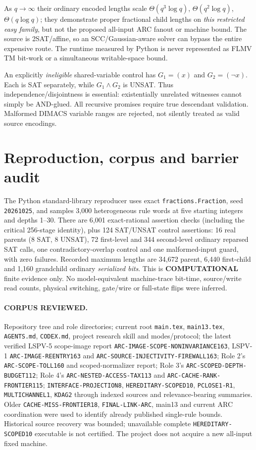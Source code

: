 \documentclass[11pt]{article}
\begin{document}
As $q\to\infty$ their ordinary encoded lengths scale
$\Theta(q^3\log q)$, $\Theta(q^2\log q)$,
$\Theta(q\log q)$; they demonstrate proper fractional
child lengths on \emph{this restricted easy family},
but not the proposed all-input ARC fanout or machine bound.
The source is 2SAT/affine, so an SCC/Gaussian-aware solver
can bypass the entire expensive route. The runtime measured
by Python is never represented as FLMV TM bit-work or a
simultaneous writable-space bound.

An explicitly \emph{ineligible} shared-variable control has
$G_1=(x)$ and $G_2=(\neg x)$.
Each is SAT separately, while $G_1\wedge G_2$ is UNSAT.
Thus independence/disjointness is essential: existentially
unrelated witnesses cannot simply be AND-glued.
All recursive promises require true descendant validation.
Malformed DIMACS variable ranges are rejected, not silently
treated as valid source encodings.

\section{Reproduction, corpus and barrier audit}
The Python standard-library reproducer uses exact
\texttt{fractions.Fraction}, seed \texttt{20261025},
and samples 3,000 heterogeneous rule words at five starting
integers and depths 1--30. There are 6,001
exact-rational assertion checks (including the critical
256-stage identity), plus 124 SAT/UNSAT control assertions:
16 real parents (8 SAT, 8 UNSAT),
72 first-level and 344 second-level ordinary
reparsed SAT calls, one contradictory-overlap
control and one malformed-input guard, with zero failures.
Recorded maximum lengths are 34,672 parent,
6,440 first-child and 1,160 grandchild
ordinary \emph{serialized bits}. This is \textbf{COMPUTATIONAL}
finite evidence only. No model-equivalent machine-trace
bit-time, source/write read counts, physical switching,
gate/wire or full-state flips were inferred.

\paragraph{CORPUS REVIEWED.}
Repository tree and role directories; current root
\texttt{main.tex}, \texttt{main13.tex}, \texttt{AGENTS.md},
\texttt{CODEX.md}, project research skill and modes/protocol;
the latest verified LSPV-5 scope-image report
\texttt{ARC-IMAGE-SCOPE-NONINVARIANCE163},
LSPV-1 \texttt{ARC-IMAGE-REENTRY163} and
\texttt{ARC-SOURCE-INJECTIVITY-FIREWALL163};
Role 2's \texttt{ARC-SCOPE-TOLL160} and scoped-normalizer report;
Role 3's \texttt{ARC-SCOPED-DEPTH-BUDGET112};
Role 4's \texttt{ARC-NESTED-ACCESS-TAX113} and
\texttt{ARC-CACHE-RANK-FRONTIER115};
\texttt{INTERFACE-PROJECTION8},
\texttt{HEREDITARY-SCOPED10}, \texttt{PCLOSE1-R1},
\texttt{MULTICHANNEL1}, \texttt{KDAG2} through indexed sources
and relevance-bearing summaries.
Older \texttt{CACHE-MISS-FRONTIER18},
\texttt{FINAL-LINK-ARC}, main13 and current ARC coordination
were used to identify already published single-rule bounds.
Historical source recovery was bounded; unavailable complete
\texttt{HEREDITARY-SCOPED10} executable is not certified.
The project does not acquire a new all-input fixed machine.
\end{document}
